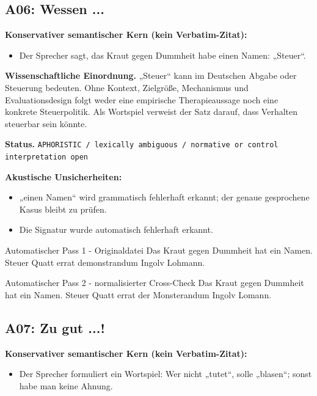 \documentclass[11pt,a4paper]{article}
\newcommand{\status}[1]{\texttt{#1}}
\begin{document}
\subsection{A06: Wessen ...}
\label{sec:a06}
\textbf{Konservativer semantischer Kern (kein Verbatim-Zitat):}
\begin{itemize}
\item Der Sprecher sagt, das Kraut gegen Dummheit habe einen Namen: „Steuer“.
\end{itemize}

\textbf{Wissenschaftliche Einordnung.} „Steuer“ kann im Deutschen Abgabe oder Steuerung bedeuten. Ohne Kontext, Zielgröße, Mechanismus und Evaluationsdesign folgt weder eine empirische Therapieaussage noch eine konkrete Steuerpolitik. Als Wortspiel verweist der Satz darauf, dass Verhalten steuerbar sein könnte.

\textbf{Status.} \status{APHORISTIC / lexically ambiguous / normative or control interpretation open}

\textbf{Akustische Unsicherheiten:}
\begin{itemize}
\item „einen Namen“ wird grammatisch fehlerhaft erkannt; der genaue gesprochene Kasus bleibt zu prüfen.
\item Die Signatur wurde automatisch fehlerhaft erkannt.
\end{itemize}

\begin{asrbox}{Automatischer Pass 1 - Originaldatei}
Das Kraut gegen Dummheit hat ein Namen. Steuer Quatt errat demonstrandum Ingolv Lohmann.
\end{asrbox}

\begin{asrbox}{Automatischer Pass 2 - normalisierter Cross-Check}
Das Kraut gegen Dummheit hat ein Namen. Steuer Quatt errat der Monsterandum Ingolv Lomann.
\end{asrbox}


\subsection{A07: Zu gut ...!}
\label{sec:a07}
\textbf{Konservativer semantischer Kern (kein Verbatim-Zitat):}
\begin{itemize}
\item Der Sprecher formuliert ein Wortspiel: Wer nicht „tutet“, solle „blasen“; sonst habe man keine Ahnung.
\end{itemize}
\end{document}
